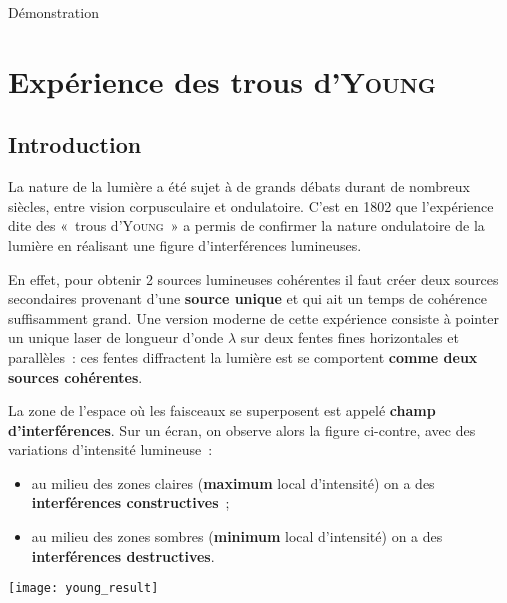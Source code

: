 \documentclass[../main/main.tex]{subfiles}
\begin{document}
\begin{rdemo}{Démonstration}
    \vspace{-10pt}
\end{rdemo}

\section{Expérience des trous d'\textsc{Young}}
\subsection{Introduction}

La nature de la lumière a été sujet à de grands débats durant de nombreux
siècles, entre vision corpusculaire et ondulatoire. C'est en 1802 que
l'expérience dite des «~trous d'\textsc{Young}~» a permis de confirmer la nature
ondulatoire de la lumière en réalisant une figure d'interférences
lumineuses.\bigbreak

En effet, pour obtenir 2 sources lumineuses cohérentes il faut créer deux
sources secondaires provenant d'une \textbf{source unique} et qui ait un temps
de cohérence suffisamment grand. Une version moderne de cette expérience
consiste à pointer un unique laser de longueur d'onde $\lambda$ sur deux fentes
fines horizontales et parallèles~: ces fentes diffractent la lumière est se
comportent \textbf{comme deux sources cohérentes}. \bigbreak

\begin{minipage}{0.45\linewidth}
    La zone de l'espace où les faisceaux se superposent est appelé \textbf{champ
    d'interférences}. Sur un écran, on observe alors la figure ci-contre, avec
    des variations d'intensité lumineuse~:
    \begin{itemize}
        \item au milieu des zones claires (\textbf{maximum} local d'intensité)
            on a des \textbf{interférences constructives}~;
        \item au milieu des zones sombres (\textbf{minimum} local d'intensité)
            on a des \textbf{interférences destructives}.
    \end{itemize}
\end{minipage}
\hfill
\begin{minipage}{0.50\linewidth}
    \begin{center}
        \texttt{[image: young\_result]}
    \end{center}
\end{minipage}
\end{document}

